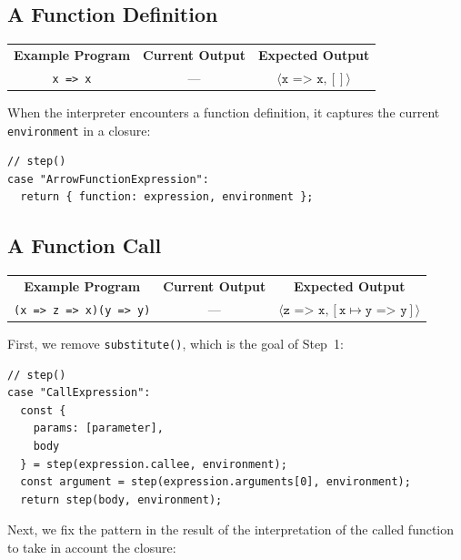 \documentclass[12pt, oneside]{book}
\begin{document}
\subsection{A Function Definition}

\begin{center}
\begin{tabular}{c|c|c}
\textbf{Example Program} & \textbf{Current Output} & \textbf{Expected Output} \\
\texttt{x => x} & — & $\langle \texttt{x => x}, [] \rangle$ \\
\end{tabular}
\end{center}

When the interpreter encounters a function definition, it captures the current \texttt{environment} in a closure:

\begin{verbatim}
// step()
case "ArrowFunctionExpression":
  return { function: expression, environment };
\end{verbatim}

\subsection{A Function Call}
\label{A Function Call}

\begin{center}
\begin{tabular}{c|c|c}
\textbf{Example Program} & \textbf{Current Output} & \textbf{Expected Output} \\
\texttt{(x => z => x)(y => y)} & — & $\langle \texttt{z => x}, [\texttt{x}\mapsto\texttt{y => y}] \rangle$ \\
\end{tabular}
\end{center}

First, we remove \texttt{substitute()}, which is the goal of Step~1:

\begin{verbatim}
// step()
case "CallExpression":
  const {
    params: [parameter],
    body
  } = step(expression.callee, environment);
  const argument = step(expression.arguments[0], environment);
  return step(body, environment);
\end{verbatim}

Next, we fix the pattern in the result of the interpretation of the called function to take in account the closure:
\end{document}
